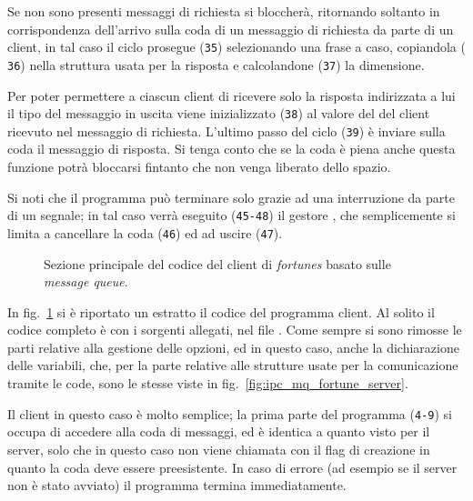 Se non sono presenti messaggi di richiesta  si bloccherà,
ritornando soltanto in corrispondenza dell'arrivo sulla coda di un messaggio
di richiesta da parte di un client, in tal caso il ciclo prosegue
(\texttt{\small 35}) selezionando una frase a caso, copiandola (\texttt{\small
  36}) nella struttura  usata per la risposta e
calcolandone (\texttt{\small 37}) la dimensione.

Per poter permettere a ciascun client di ricevere solo la risposta indirizzata
a lui il tipo del messaggio in uscita viene inizializzato (\texttt{\small 38})
al valore del  del client ricevuto nel messaggio di richiesta.
L'ultimo passo del ciclo (\texttt{\small 39}) è inviare sulla coda il
messaggio di risposta. Si tenga conto che se la coda è piena anche questa
funzione potrà bloccarsi fintanto che non venga liberato dello spazio.

Si noti che il programma può terminare solo grazie ad una interruzione da
parte di un segnale; in tal caso verrà eseguito (\texttt{\small 45-48}) il
gestore , che semplicemente si limita a cancellare la coda
(\texttt{\small 46}) ed ad uscire (\texttt{\small 47}).

\begin{figure}[!htbp]
  \footnotesize \centering
  \begin{minipage}[c]{\codesamplewidth}
  \end{minipage} 
  \normalsize 
  \caption{Sezione principale del codice del client di \textit{fortunes}
    basato sulle \textit{message queue}.}
  \label{fig:ipc_mq_fortune_client}
\end{figure}

In fig.~\ref{fig:ipc_mq_fortune_client} si è riportato un estratto il codice
del programma client.  Al solito il codice completo è con i sorgenti allegati,
nel file .  Come sempre si sono rimosse le parti
relative alla gestione delle opzioni, ed in questo caso, anche la
dichiarazione delle variabili, che, per la parte relative alle strutture usate
per la comunicazione tramite le code, sono le stesse viste in
fig.~\ref{fig:ipc_mq_fortune_server}.

Il client in questo caso è molto semplice; la prima parte del programma
(\texttt{\small 4-9}) si occupa di accedere alla coda di messaggi, ed è
identica a quanto visto per il server, solo che in questo caso 
non viene chiamata con il flag di creazione in quanto la coda deve essere
preesistente. In caso di errore (ad esempio se il server non è stato avviato)
il programma termina immediatamente. 

